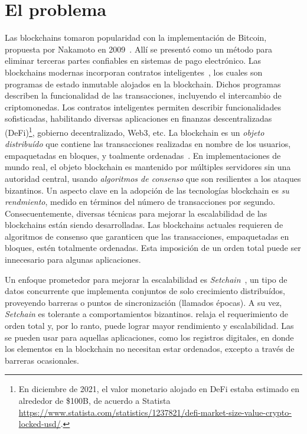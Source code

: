 
\section{El problema}
Las blockchains tomaron
popularidad con la implementación de Bitcoin, propuesta por Nakamoto en
2009~\cite{nakamoto06bitcoin}.
Allí se presentó como un método para eliminar terceras partes confiables en sistemas
de pago electrónico.
%
Las blockchains modernas incorporan contratos inteligentes~\cite{szabo96smart,ethereum},
los cuales son programas de estado inmutable alojados en la blockchain. Dichos
programas describen la funcionalidad de las transacciones, incluyendo el intercambio
de criptomonedas.
%
Los contratos inteligentes permiten describir funcionalidades sofisticadas, habilitando
diversas aplicaciones en finanzas descentralizadas (DeFi)\footnote{En diciembre de 2021,
el valor monetario alojado en DeFi estaba estimado en alrededor de \$100B, de acuerdo a Statista
\url{https://www.statista.com/statistics/1237821/defi-market-size-value-crypto-locked-usd/}.},
gobierno decentralizado, Web3, etc.
%
La blockchain es un \textit{objeto distribuído} que contiene las transacciones realizadas
en nombre de los usuarios, empaquetadas en bloques, y toalmente
ordenadas~\cite{anta2018formalizing,anta2021principles}.
%
En implementaciones de mundo real, el objeto blockchain es mantenido por múltiples servidores
sin una autoridad central, usando \emph{algoritmos de consenso} que son resilientes a los
ataques bizantinos.
%
Un aspecto clave en la adopción de las tecnologías blockchain es \emph{su rendmiento}, medido
en términos del número de transacciones por segundo.
%
Consecuentemente, diversas técnicas para mejorar la escalabilidad de las blockchains
están siendo desarrolladas.
%
Las blockchains actuales requieren de algoritmos de consenso que garanticen que las
transacciones, empaquetadas en bloques, estén totalmente ordenadas.
%
Esta imposición de un orden total puede ser innecesario para algunas aplicaciones.

%
Un enfoque prometedor para mejorar la escalabilidad es \textit{Setchain}~\cite{Capretto.2022.Setchain},
un tipo de datos concurrente que implementa conjuntos de solo crecimiento distribuídos,
proveyendo barreras o puntos de sincronización (llamados épocas). A su vez,
\textit{Setchain} es tolerante a comportamientos bizantinos.
%
\setchain relaja el requerimiento de orden total y, por lo ranto, puede lograr mayor
rendimiento y escalabilidad.
%
Las \setchains se pueden usar para aquellas aplicaciones, como los registros digitales,
en donde los elementos en la blockchain no necesitan estar ordenados, excepto a través
de barreras ocasionales.


